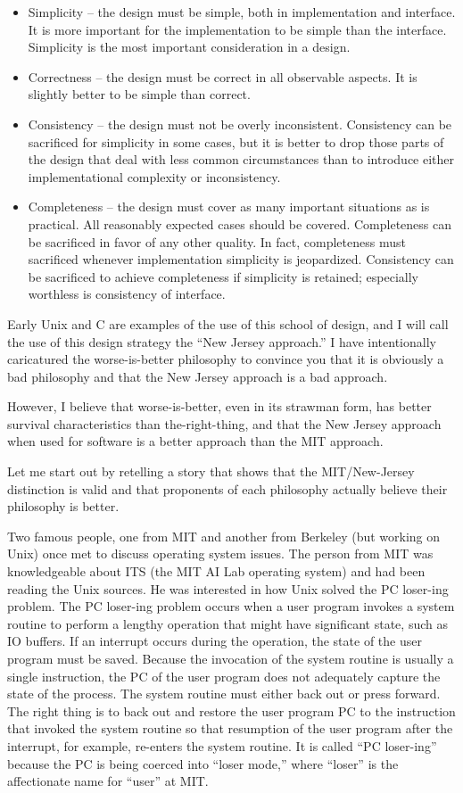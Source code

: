 \documentclass[10pt,twoside,openright]{memoir}
\begin{document}
\begin{itemize}
\item Simplicity -- the design must be simple, both in implementation and interface. It is more important for the implementation to be simple than the interface. Simplicity is the most important consideration in a design.
\item Correctness -- the design must be correct in all observable aspects. It is slightly better to be simple than correct.
\item Consistency -- the design must not be overly inconsistent. Consistency can be sacrificed for simplicity in some cases, but it is better to drop those parts of the design that deal with less common circumstances than to introduce either implementational complexity or inconsistency.
\item Completeness -- the design must cover as many important situations as is practical. All reasonably expected cases should be covered. Completeness can be sacrificed in favor of any other quality. In fact, completeness must sacrificed whenever implementation simplicity is jeopardized. Consistency can be sacrificed to achieve completeness if simplicity is retained; especially worthless is consistency of interface.
\end{itemize}
Early Unix and C are examples of the use of this school of design, and I will call the use of this design strategy the ``New Jersey approach.'' I have intentionally caricatured the worse-is-better philosophy to convince you that it is obviously a bad philosophy and that the New Jersey approach is a bad approach.

However, I believe that worse-is-better, even in its strawman form, has better survival characteristics than the-right-thing, and that the New Jersey approach when used for software is a better approach than the MIT approach.

Let me start out by retelling a story that shows that the MIT/New-Jersey distinction is valid and that proponents of each philosophy actually believe their philosophy is better.

Two famous people, one from MIT and another from Berkeley (but working on Unix) once met to discuss operating system issues. The person from MIT was knowledgeable about ITS (the MIT AI Lab operating system) and had been reading the Unix sources. He was interested in how Unix solved the PC loser-ing problem. The PC loser-ing problem occurs when a user program invokes a system routine to perform a lengthy operation that might have significant state, such as IO buffers. If an interrupt occurs during the operation, the state of the user program must be saved. Because the invocation of the system routine is usually a single instruction, the PC of the user program does not adequately capture the state of the process. The system routine must either back out or press forward. The right thing is to back out and restore the user program PC to the instruction that invoked the system routine so that resumption of the user program after the interrupt, for example, re-enters the system routine. It is called ``PC loser-ing'' because the PC is being coerced into ``loser mode,'' where ``loser'' is the affectionate name for ``user'' at MIT.
\end{document}
